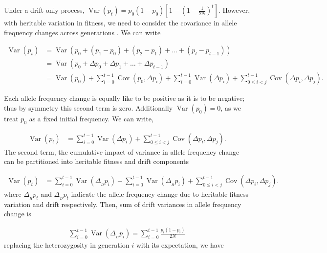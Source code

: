 \documentclass[11pt]{article}
\DeclareMathOperator{\var}{Var}
\DeclareMathOperator{\cov}{Cov}
\begin{document}
Under a drift-only process, $\var(p_t) = p_0(1-p_0)\left[1- \left(1 -
\frac{1}{2N}\right)^t\right]$. However, with heritable variation in fitness, we
need to consider the covariance in allele frequency changes across generations
\parencite{Buffalo2019-io}. We can write

\begin{align}
  \var(p_t) &= \var\left(p_0 + (p_1 - p_0) + (p_2 - p_1) + \ldots + (p_t - p_{t-1}) \right) \\
         &= \var\left(p_0 + \Delta p_0 + \Delta p_1 + \ldots + \Delta p_{t-1} \right) \\
         &= \var(p_0) + \sum_{i=0}^{t-1} \cov(p_0, \Delta p_i) + \sum_{i=0}^{t-1} \var(\Delta p_i) + \sum_{0 \le i < j}^{t-1} \cov(\Delta p_i, \Delta p_j).
\end{align}
%

Each allele frequency change is equally like to be positive as it is to be
negative; thus by symmetry this second term is zero. Additionally $\var(p_0) = 0$,
as we treat $p_0$ as a fixed initial frequency. We can write, 

\begin{align}
  \var(p_t) &= \sum_{i=0}^{t-1} \var(\Delta p_i) + \sum_{0 \le i < j}^{t-1} \cov(\Delta p_i, \Delta p_j).
\end{align}
%
The second term, the cumulative impact of variance in allele frequency change
can be partitioned into heritable fitness and drift components
\parencite{Santiago1995-hx,Buffalo2019-io}

\begin{align}
  \var(p_t) &= \sum_{i=0}^{t-1} \var(\Delta_{_D} p_i) + \sum_{i=0}^{t-1} \var(\Delta_{_H} p_i) + \sum_{0 \le i < j}^{t-1} \cov(\Delta p_i, \Delta p_j).
\end{align}
%
where $\Delta_{_H} p_t$ and $\Delta_{_D} p_t$ indicate the allele frequency
change due to heritable fitness variation and drift respectively. Then, sum of
drift variances in allele frequency change is

\begin{align}
  \sum_{i=0}^{t-1} \var(\Delta_{_D} p_i) = \sum_{i=0}^{t-1} \frac{p_i(1-p_i)}{2N}
\end{align}
%
replacing the heterozygosity in generation $i$ with its expectation, we have
\end{document}

